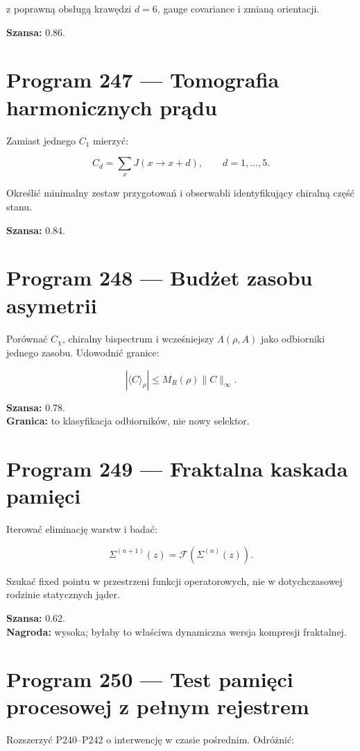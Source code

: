 \documentclass[11pt,a4paper,openany]{report}
\begin{document}
z poprawną obsługą krawędzi \(d=6\), gauge covariance i zmianą orientacji.

\textbf{Szansa:} 0.86.

\section{Program 247 --- Tomografia harmonicznych prądu}

Zamiast jednego \(C_1\) mierzyć:

\[
C_d=\sum_xJ(x\to x+d),\qquad d=1,\ldots,5.
\]

Określić minimalny zestaw przygotowań i obserwabli identyfikujący chiralną część stanu.

\textbf{Szansa:} 0.84.

\section{Program 248 --- Bud\.zet zasobu asymetrii}

Porównać \(C_\chi\), chiralny bispectrum i wcześniejszy \(\Lambda(\rho,A)\) jako odbiorniki jednego zasobu. Udowodnić granice:

\[
|\langle C\rangle_\rho|
\leq M_R(\rho)\|C\|_\infty.
\]

\textbf{Szansa:} 0.78.\\
\textbf{Granica:} to klasyfikacja odbiorników, nie nowy selektor.

\section{Program 249 --- Fraktalna kaskada pamięci}

Iterować eliminację warstw i badać:

\[
\Sigma^{(n+1)}(z)=\mathcal F(\Sigma^{(n)}(z)).
\]

Szukać fixed pointu w przestrzeni funkcji operatorowych, nie w dotychczasowej rodzinie statycznych jąder.

\textbf{Szansa:} 0.62.\\
\textbf{Nagroda:} wysoka; byłaby to właściwa dynamiczna wersja kompresji fraktalnej.

\section{Program 250 --- Test pamięci procesowej z pełnym rejestrem}

Rozszerzyć P240--P242 o interwencję w czasie pośrednim. Odró\.znić:
\end{document}
